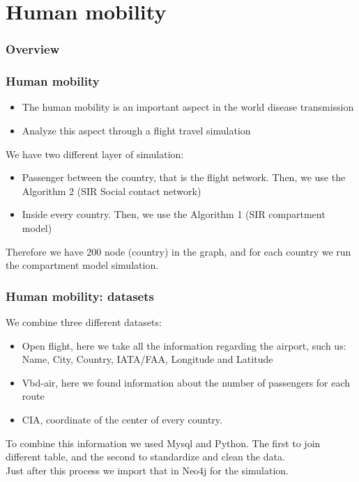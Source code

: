 \documentclass{beamer}
\begin{document}
\section{Human mobility}
\begin{frame}
\frametitle{Overview} %
\tableofcontents[currentsection] %
\end{frame}

\begin{frame}
\frametitle{Human mobility}
\begin{itemize}
\item The human mobility is an important aspect in the world disease transmission
\item Analyze this aspect through a flight travel simulation
\end{itemize}
\vspace{10pt}
We have two different layer of simulation:
\begin{itemize}
\item Passenger between the country, that is the flight network. Then, we use the Algorithm 2 (SIR Social contact network)
\item Inside every country. Then, we use the Algorithm 1 (SIR compartment model)
\end{itemize}
Therefore we have 200 node (country) in the graph, and for each country we run the compartment model simulation. 
\end{frame}




\begin{frame}
\frametitle{Human mobility: datasets}
We combine three different datasets:
\begin{itemize}
\item Open flight, here we take all the information regarding the airport, such us: Name, City, Country, IATA/FAA, Longitude and Latitude
\item Vbd-air, here we found information about the number of passengers for each route
\item CIA, coordinate of the center of every country.
\end{itemize} 
To combine this information we used Mysql and Python. The first to join different table, and the second to standardize and clean the data. \\
Just after this process we import that in Neo4j for the simulation.
\end{frame}
\end{document}
